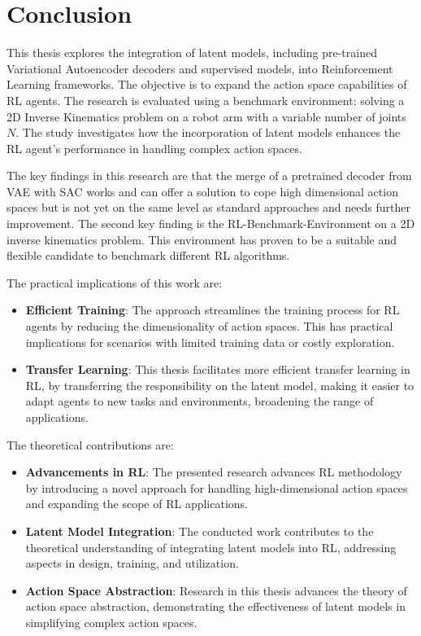 \chapter{Conclusion}\label{chap:conclusion}


This thesis explores the integration of latent models, including pre-trained Variational Autoencoder decoders and supervised models, into Reinforcement Learning frameworks. The objective is to expand the action space capabilities of RL agents. The research is evaluated using a benchmark environment: solving a 2D Inverse Kinematics problem on a robot arm with a variable number of joints $N$. The study investigates how the incorporation of latent models enhances the RL agent's performance in handling complex action spaces.

The key findings in this research are that the merge of a pretrained decoder from VAE with SAC works and can offer a solution to cope high dimensional action spaces but is not yet on the same level as standard approaches and needs further improvement. The second key finding is the RL-Benchmark-Environment on a 2D inverse kinematics problem. This environment has proven to be a suitable and flexible candidate to benchmark different RL algorithms. 

The practical implications of this work are:
\begin{itemize}
    \item \textbf{Efficient Training}: The approach streamlines the training process for RL agents by reducing the dimensionality of action spaces. This has practical implications for scenarios with limited training data or costly exploration.
    \item \textbf{Transfer Learning}: This thesis facilitates more efficient transfer learning in RL, by transferring the responsibility on the latent model, making it easier to adapt agents to new tasks and environments, broadening the range of applications.
\end{itemize}

The theoretical contributions are:
\begin{itemize}
    \item \textbf{Advancements in RL}: The presented research advances RL methodology by introducing a novel approach for handling high-dimensional action spaces and expanding the scope of RL applications.
    \item \textbf{Latent Model Integration}: The conducted work contributes to the theoretical understanding of integrating latent models into RL, addressing aspects in design, training, and utilization.
    \item \textbf{Action Space Abstraction}: Research in this thesis advances the theory of action space abstraction, demonstrating the effectiveness of latent models in simplifying complex action spaces.
\end{itemize}


